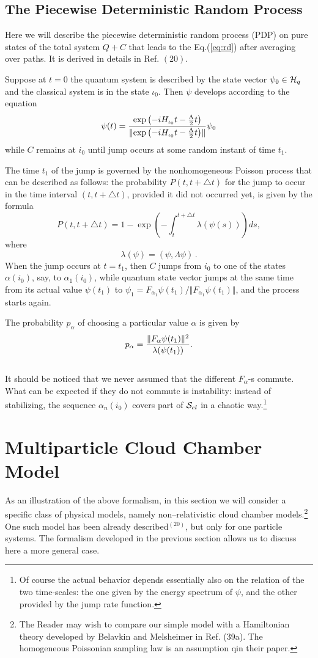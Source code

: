 \documentclass[12pt]{article}
\def\hq{{\cal H}_q}
\def\cs{{\cal S}_{cl}}
\def\be{\begin{equation}}
\def\ee{\end{equation}}
\begin{document}
\subsection{ The Piecewise Deterministic Random Process}
Here we will describe the piecewise deterministic random process (PDP)
on pure states of the total system $Q+C$ that leads to the
Eq.(\ref{eq:rd}) after averaging over paths. It is derived in details in
Ref. $(20)$.

Suppose at $t=0$ the quantum system is described by the state vector
$\psi_0\in\hq$ and the classical system is in the state $\iota_0$. Then
$\psi$ develops according to the equation
\be
\psi(t)={{\exp\left(-iH_{\iota_0}t-{\Lambda\over2}t\right)}\over\Vert
{\exp\left(-iH_{\iota_0}t-{\Lambda\over2}t\right)}\Vert}\psi_0
\ee
while $C$ remains at $i_0$ until jump occurs at some random instant
of time $t_1$.

The time $t_1$ of the jump is governed by the nonhomogeneous Poisson
process that can be described as follows: the probability
$P(t,t+\triangle t)$ for the jump to occur in the time interval
$(t,t+\triangle t)$, provided it did not occurred yet, is given by the
formula
\be
P(t,t+\triangle t)=1-\exp \left(-\int_t^{t+\triangle t}
\lambda(\psi(s))\right)ds ,\label{eq:rt}
\ee
where
\be
\lambda(\psi)=(\psi, \Lambda \psi)\, .
\ee
When the jump occurs at $t=t_1$, then $C$ jumps from $i_0$ to one of the
states $\alpha(i_0)$, say, to $\alpha_1(i_0)$, while quantum state
vector jumps at the same time from its actual value $\psi(t_1)$ to
$\psi_1={F_{\alpha_1} \psi(t_1)}/{\Vert F_{\alpha_1} \psi(t_1)\Vert}$,
and the process starts again.

The probability $p_\alpha$ of choosing a particular value $\alpha$ is
given by
\be p_\alpha={\Vert F_\alpha\psi(t_1)\Vert^2\over\lambda(\psi(t_1))}.
\ee
\medskip\\
It should be noticed that we never assumed that the different
$F_\alpha$-s commute. What can be expected if they do not commute is
instability: instead of stabilizing, the sequence $\alpha_n(i_0)$ covers
part of $\cs$ in a chaotic way.\footnote{Of course the actual behavior
depends essentially also on the relation of the two time-scales: the one
given by the energy spectrum of $\psi$, and the other provided by the
jump rate function.}

\section{Multiparticle Cloud Chamber Model}
As an illustration of the above formalism, in this section we will
consider a specific class of physical models, namely non--relativistic
cloud chamber models.\footnote{The Reader may wish to compare our
simple model with a Hamiltonian theory developed by Belavkin
and Melsheimer in Ref. (39a). The homogeneous Poissonian sampling law is
an assumption qin their paper.}   One such model has been already
described$^{(20)}$, but only for one particle systems. The formalism
developed in the previous section allows us to discuss here a  more
general case.\medskip
\end{document}
